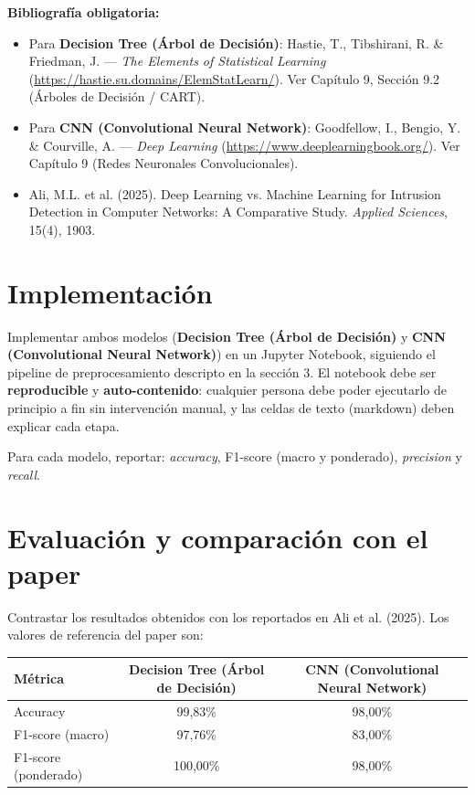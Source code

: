 \documentclass[11pt,a4paper]{article}
\begin{document}
\textbf{Bibliograf\'ia obligatoria:}
\begin{itemize}[leftmargin=2em,itemsep=2pt]
    \item Para \textbf{Decision Tree (Árbol de Decisión)}: Hastie, T., Tibshirani, R. \& Friedman, J. --- \textit{The Elements of Statistical Learning} (\url{https://hastie.su.domains/ElemStatLearn/}). Ver Capítulo 9, Sección 9.2 (Árboles de Decisión / CART).
    \item Para \textbf{CNN (Convolutional Neural Network)}: Goodfellow, I., Bengio, Y. \& Courville, A. --- \textit{Deep Learning} (\url{https://www.deeplearningbook.org/}). Ver Capítulo 9 (Redes Neuronales Convolucionales).
    \item Ali, M.L. et al. (2025). Deep Learning vs. Machine Learning for Intrusion Detection in Computer Networks: A Comparative Study. \textit{Applied Sciences}, 15(4), 1903.
\end{itemize}

\section{Implementaci\'on}
Implementar ambos modelos (\textbf{Decision Tree (Árbol de Decisión)} y \textbf{CNN (Convolutional Neural Network)}) en un Jupyter Notebook, siguiendo el pipeline de preprocesamiento descripto en la secci\'on 3. El notebook debe ser \textbf{reproducible} y \textbf{auto-contenido}: cualquier persona debe poder ejecutarlo de principio a fin sin intervenci\'on manual, y las celdas de texto (markdown) deben explicar cada etapa.

Para cada modelo, reportar: \textit{accuracy}, F1-score (macro y ponderado), \textit{precision} y \textit{recall}.

\section{Evaluaci\'on y comparaci\'on con el paper}
Contrastar los resultados obtenidos con los reportados en Ali et al. (2025). Los valores de referencia del paper son:

\begin{center}
\begin{tabular}{lcc}
        \toprule
        \textbf{M\'etrica} & \textbf{Decision Tree (Árbol de Decisión)} & \textbf{CNN (Convolutional Neural Network)} \\
        \midrule
        Accuracy & 99,83\% & 98,00\% \\
        F1-score (macro) & 97,76\% & 83,00\% \\
        F1-score (ponderado) & 100,00\% & 98,00\% \\
        \bottomrule
\end{tabular}
\end{center}
\end{document}
